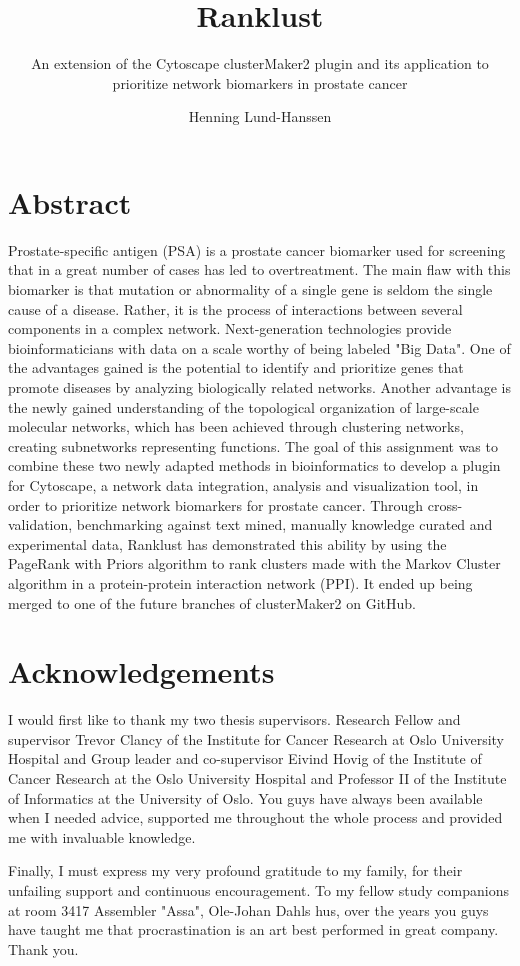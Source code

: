 \documentclass[a4paper,UKenglish]{ifimaster}
\title{Ranklust}
\subtitle{An extension of the Cytoscape clusterMaker2 plugin and its application
to prioritize network biomarkers in prostate cancer}
\author{Henning Lund-Hanssen}
\begin{document}
\duoforside[program={Programming and Networks},
    dept={Department of Informatics},long]

\frontmatter{}

\setlength{\parskip}{12pt}
\setlength{\parindent}{12pt}

\chapter*{Abstract}
Prostate-specific antigen (PSA) is a prostate cancer biomarker used for
screening that in a great number of cases has led to overtreatment. The main
flaw with this biomarker is that mutation or abnormality of a single gene is
seldom the single cause of a disease. Rather, it is the process of interactions
between several components in a complex network. Next-generation technologies
provide bioinformaticians with data on a scale worthy of being labeled "Big
Data". One of the advantages gained is the potential to identify and prioritize
genes that promote diseases by analyzing biologically related networks. Another
advantage is the newly gained understanding of the topological organization of
large-scale molecular networks, which has been achieved through clustering
networks, creating subnetworks representing functions. The goal of this
assignment was to combine these two newly adapted methods in bioinformatics to
develop a plugin for Cytoscape, a network data integration, analysis and
visualization tool, in order to prioritize network biomarkers for prostate
cancer. Through cross-validation, benchmarking against text mined, manually
knowledge curated and experimental data, Ranklust has demonstrated this ability
by using the PageRank with Priors algorithm to rank clusters made with the
Markov Cluster algorithm in a protein-protein interaction network (PPI). It
ended up being merged to one of the future branches of clusterMaker2 on GitHub.

\chapter*{Acknowledgements}
I would first like to thank my two thesis supervisors. Research Fellow and
supervisor Trevor Clancy of the Institute for Cancer Research at Oslo University
Hospital and Group leader and co-supervisor Eivind Hovig of the Institute of
Cancer Research at the Oslo University Hospital and Professor II of the
Institute of Informatics at the University of Oslo. You guys have always been
available when I needed advice, supported me throughout the whole process and
provided me with invaluable knowledge.

Finally, I must express my very profound gratitude to my family, for their
unfailing support and continuous encouragement. To my fellow study companions at
room 3417 Assembler "Assa", Ole-Johan Dahls hus, over the years you guys have
taught me that procrastination is an art best performed in great company. Thank
you.

\tableofcontents{}
\listoffigures{}
\listoftables{}
\lstlistoflistings
\printglossaries

\mainmatter{}





\backmatter{}
\printbibliography
\end{document}
